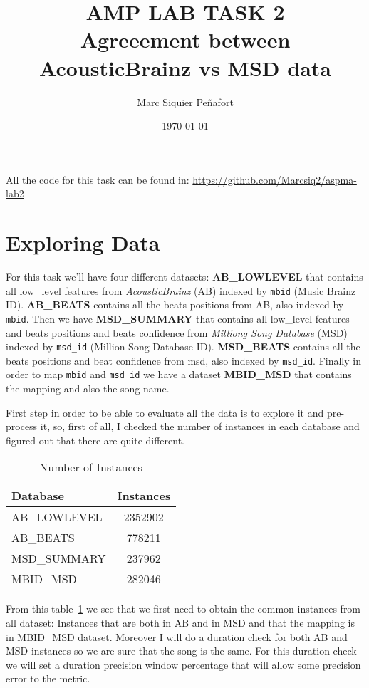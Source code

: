 \documentclass[a4paper]{article}
\title{AMP LAB TASK 2\\
Agreeement between AcousticBrainz vs MSD data}
\author{Marc Siquier Peñafort}
\date{\today}
\begin{document}
\maketitle
All the code for this task can be found in: \url{https://github.com/Marcsiq2/aspma-lab2}
\section{Exploring Data}

For this task we'll have four different datasets: \textbf{AB\_LOWLEVEL} that contains all low\_level features from \textit{AcousticBrainz} (AB) indexed by \texttt{mbid} (Music Brainz ID). \textbf{AB\_BEATS} contains all the beats positions from AB, also indexed by \texttt{mbid}. Then we have \textbf{MSD\_SUMMARY} that contains all low\_level features and beats positions and beats confidence from  \textit{Milliong Song Database} (MSD) indexed by \texttt{msd\_id} (Million Song Database ID). \textbf{MSD\_BEATS} contains all the beats positions and beat confidence from msd, also indexed by \texttt{msd\_id}. Finally in order to map \texttt{mbid} and \texttt{msd\_id} we have a  dataset \textbf{MBID\_MSD} that contains the mapping and also the song name.

First step in order to be able to evaluate all the data is to explore it and pre-process it, so, first of all, I checked the number of instances in each database and figured out that there are quite different.

\begin{table}[ht!]
\centering
\begin{tabular}{lc}
\textbf{Database} & \textbf{Instances} \\ \hline 
AB\_LOWLEVEL & 2352902 \\
AB\_BEATS & 778211 \\
MSD\_SUMMARY & 237962 \\
MBID\_MSD & 282046 \\ \hline
\end{tabular}
\caption{Number of Instances}
\label{tab:num}
\end{table}

From this table~\ref{tab:num} we see that we first need to obtain the common instances from all dataset: Instances that are both in AB and in MSD and that the mapping is in MBID\_MSD dataset. Moreover I will do a duration check for both AB and MSD instances so we are sure that the song is the same. For this duration check we will set a duration precision window percentage that will allow some precision error to the metric.
\end{document}
